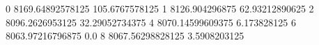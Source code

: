 0 8169.64892578125 105.6767578125
1 8126.904296875 62.93212890625
2 8096.2626953125 32.29052734375
4 8070.14599609375 6.173828125
6 8063.97216796875 0.0
8 8067.56298828125 3.5908203125

